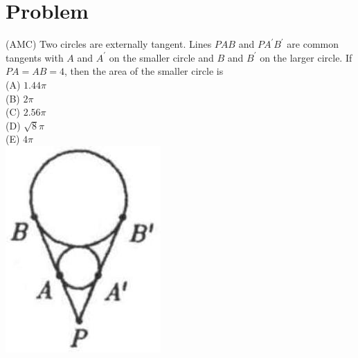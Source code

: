 \documentclass{article}
\begin{document}
\section*{Problem}
(AMC) Two circles are externally tangent. Lines \(P A B\) and \(P A^{\prime} B^{\prime}\) are common tangents with \(A\) and \(A^{\prime}\) on the smaller circle and \(B\) and \(B^{\prime}\) on the larger circle. If \(P A=A B=4\), then the area of the smaller circle is\\
(A) \(1.44 \pi\)\\
(B) \(2 \pi\)\\
(C) \(2.56 \pi\)\\
(D) \(\sqrt{8} \pi\)\\
(E) \(4 \pi\)\\
\centering
\includegraphics[width=\textwidth]{images/184(2).jpg}
\end{document}
